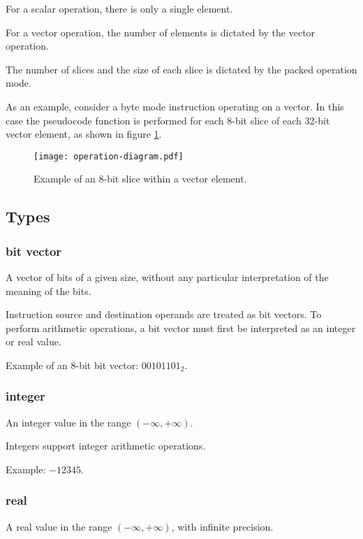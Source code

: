 For a scalar operation, there is only a single element.

For a vector operation, the number of elements is dictated by the vector
operation.

The number of slices and the size of each slice is dictated by the packed
operation mode.

As an example, consider a byte mode instruction operating on a vector. In this
case the pseudocode function is performed for each 8-bit slice of each 32-bit
vector element, as shown in figure \ref{fig:operation-diagram}.

\begin{figure}[h]
  \texttt{[image: operation-diagram.pdf]}
  \caption{Example of an 8-bit slice within a vector element.}
  \label{fig:operation-diagram}
\end{figure}

\subsection{Types}

\subsubsection{bit vector}

A vector of bits of a given size, without any particular interpretation of the
meaning of the bits.

Instruction source and destination operands are treated as bit vectors. To
perform arithmetic operations, a bit vector must first be interpreted as an
integer or real value.

Example of an 8-bit bit vector: $00101101_2$.

\subsubsection{integer}

An integer value in the range $(-\infty, +\infty)$.

Integers support integer arithmetic operations.

Example: $-12345$.

\subsubsection{real}

A real value in the range $(-\infty, +\infty)$, with infinite precision.


